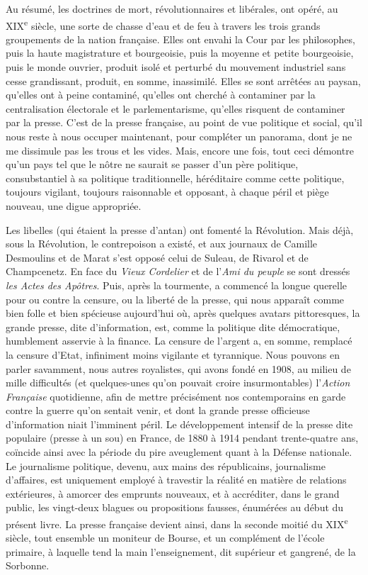 \documentclass[french,twoside]{book} %
\begin{document}
Au résumé, les doctrines de mort, révolutionnaires et libérales, ont opéré, au XIX\textsuperscript{e} siècle, une sorte de chasse d’eau et de feu à travers les trois grands groupements de la nation française. Elles ont envahi la Cour par les philosophes, puis la haute magistrature et bourgeoisie, puis la moyenne et petite bourgeoisie, puis le monde ouvrier, produit isolé et perturbé du mouvement industriel sans cesse grandissant, produit, en somme, inassimilé. Elles se sont arrêtées au paysan, qu’elles ont à peine contaminé, qu’elles ont cherché à contaminer par la centralisation électorale et le parlementarisme, qu’elles risquent de contaminer par la presse. C’est de la presse française, au point de vue politique et social, qu’il nous reste à nous occuper maintenant, pour compléter un panorama, dont je ne me dissimule pas les trous et les vides. Mais, encore une fois, tout ceci démontre qu’un pays tel que le nôtre ne saurait se passer d’un père politique, consubstantiel à sa politique traditionnelle, héréditaire comme cette politique, toujours vigilant, toujours raisonnable et opposant, à chaque péril et piège nouveau, une digue appropriée.\par
Les libelles (qui étaient la presse d’antan) ont fomenté la Révolution. Mais déjà, sous la Révolution, le contrepoison a existé, et aux journaux de Camille Desmoulins et de Marat s’est opposé celui de Suleau, de Rivarol et de Champcenetz. En face du {\itshape Vieux Cordelier} et de l’{\itshape Ami du peuple} se sont dressés {\itshape les Actes des Apôtres}. Puis, après la tourmente, a commencé la longue querelle pour ou contre la censure, ou la liberté de la presse, qui nous apparaît comme bien folle et bien spécieuse aujourd’hui où, après quelques avatars pittoresques, la grande presse, dite d’information, est, comme la politique dite démocratique, humblement asservie à la finance. La censure de l’argent a, en somme, remplacé la censure d’Etat, infiniment moins vigilante et tyrannique. Nous pouvons en parler savamment, nous autres royalistes, qui avons fondé en 1908, au milieu de mille difficultés (et quelques-unes qu’on pouvait croire insurmontables) l’{\itshape Action Française} quotidienne, afin de mettre précisément nos contemporains en garde contre la guerre qu’on sentait venir, et dont la grande presse officieuse d’information niait l’imminent péril. Le développement intensif de la presse dite populaire (presse à un sou) en France, de 1880 à 1914 pendant trente-quatre ans, coïncide ainsi avec la période du pire aveuglement quant à la Défense nationale. Le journalisme politique, devenu, aux mains des républicains, journalisme d’affaires, est uniquement employé à travestir la réalité en matière de relations extérieures, à amorcer des emprunts nouveaux, et à accréditer, dans le grand public, les vingt-deux blagues ou propositions fausses, énumérées au début du présent livre. La presse française devient ainsi, dans la seconde moitié du XIX\textsuperscript{e} siècle, tout ensemble un moniteur de Bourse, et un complément de l’école primaire, à laquelle tend la main l’enseignement, dit supérieur et gangrené, de la Sorbonne.\par
\end{document}
